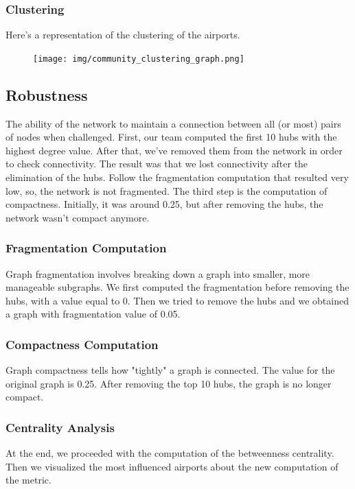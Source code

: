 \documentclass[12pt]{article}
\begin{document}
\subsubsection{Clustering}
Here's a representation of the clustering of the airports.

\begin{figure}[H]
    \centering
    \texttt{[image: img/community\_clustering\_graph.png]}
\end{figure}

\subsection{Robustness}
The ability of the network to maintain a connection between all (or most) pairs of nodes when challenged. First, our team computed the first 10 hubs with the highest degree value. After that, we've removed them from the network in order to check connectivity. The result was that we lost connectivity after the elimination of the hubs. Follow the fragmentation computation that resulted very low, so, the network is not fragmented. The third step is the computation of compactness. Initially, it was around 0.25, but after removing the hubs, the network wasn't compact anymore.

\subsubsection{Fragmentation Computation}
Graph fragmentation involves breaking down a graph into smaller, more manageable subgraphs. We first computed the fragmentation before removing the hubs, with a value equal to 0. Then we tried to remove the hubs and we obtained a graph with fragmentation value of 0.05.

\subsubsection{Compactness Computation}
Graph compactness tells how "tightly" a graph is connected. The value for the original graph is 0.25. After removing the top 10 hubs, the graph is no longer compact.

\subsubsection{Centrality Analysis}
At the end, we proceeded with the computation of the betweenness centrality. Then we visualized the most influenced airports about the new computation of the metric.
\end{document}
